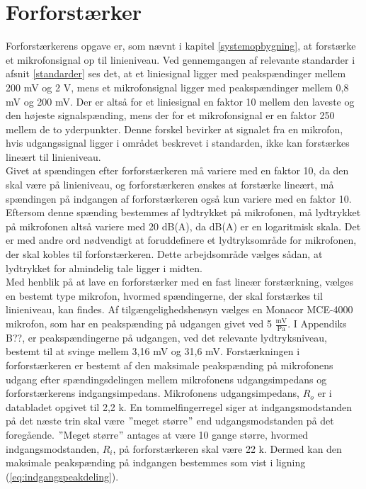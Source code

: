 \chapter{Forforstærker}
\label{forforstaerker}
Forforstærkerens opgave er, som nævnt i kapitel \ref{systemopbygning}, at forstærke et mikrofonsignal op til linieniveau. Ved gennemgangen af relevante standarder i afsnit \ref{standarder} ses det, at et liniesignal ligger med peakspændinger mellem 200 mV og 2 V, mens et mikrofonsignal ligger med peakspændinger mellem 0,8 mV og 200 mV. Der er altså for et liniesignal en faktor 10 mellem den laveste og den højeste signalspænding, mens der for et mikrofonsignal er en faktor 250 mellem de to yderpunkter. Denne forskel bevirker at signalet fra en mikrofon, hvis udgangssignal ligger i området beskrevet i standarden, ikke kan forstærkes lineært til linieniveau.\\ 
Givet at spændingen efter forforstærkeren må variere med en faktor 10, da den skal være på linieniveau, og forforstærkeren ønskes at forstærke lineært, må spændingen på indgangen af forforstærkeren også kun variere med en faktor 10. Eftersom denne spænding bestemmes af lydtrykket på mikrofonen, må lydtrykket på mikrofonen altså variere med 20 dB(A), da dB(A) er en logaritmisk skala. Det er med andre ord nødvendigt at foruddefinere et lydtryksområde for mikrofonen, der skal kobles til forforstærkeren. Dette arbejdsområde vælges sådan, at lydtrykket for almindelig tale ligger i midten. \\
Med henblik på at lave en forforstærker med en fast lineær forstærkning, vælges en bestemt type mikrofon, hvormed spændingerne, der skal forstærkes til linieniveau, kan findes. Af tilgængelighedshensyn vælges en Monacor MCE-4000 mikrofon, som har en peakspænding på udgangen givet ved 5 $\mathrm{\tfrac{mV}{Pa}}$. I Appendiks B??, er peakspændingerne på udgangen, ved det relevante lydtryksniveau, bestemt til at svinge mellem 3,16 mV og 31,6 mV. Forstærkningen i forforstærkeren er bestemt af den maksimale peakspænding på mikrofonens udgang efter spændingsdelingen mellem mikrofonens udgangsimpedans og forforstærkerens indgangsimpedans. Mikrofonens udgangsimpedans, $R_o$ er i databladet \cite{mic-datablad} opgivet til 2,2 k\ohm. En tommelfingerregel  siger at indgangsmodstanden på det næste trin skal være $"$meget større$"$ end udgangsmodstanden på det foregående. $"$Meget større$"$ antages at være 10 gange større, hvormed indgangsmodstanden, $R_i$, på forforstærkeren skal være 22 k\ohm. Dermed kan den maksimale peakspænding på indgangen bestemmes som vist i ligning (\ref{eq:indgangspeakdeling}).

